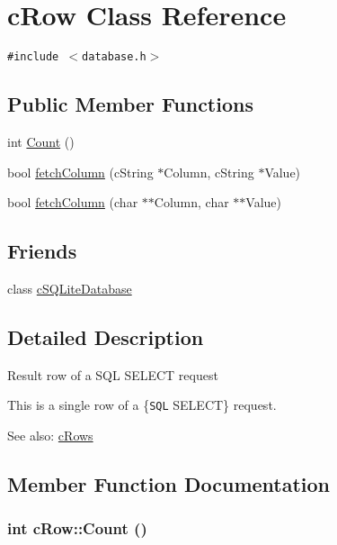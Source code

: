 \hypertarget{classcRow}{
\section{cRow Class Reference}
\label{classcRow}
}
{\tt \#include $<$database.h$>$}

\subsection*{Public Member Functions}
\begin{CompactItemize}
\item 
int \hyperlink{classcRow_88b64cc4fcf8f0974f2cf11e875fbaf4}{Count} ()
\item 
bool \hyperlink{classcRow_4b1e1e5ffe36d35c61476bc2e4ef4eb1}{fetchColumn} (cString $\ast$Column, cString $\ast$Value)
\item 
bool \hyperlink{classcRow_a2dcc3d44451c793483493502ef72eb1}{fetchColumn} (char $\ast$$\ast$Column, char $\ast$$\ast$Value)
\end{CompactItemize}
\subsection*{Friends}
\begin{CompactItemize}
\item 
\hypertarget{classcRow_224b94ad297724d01a0ad06388446137}{
class \hyperlink{classcRow_224b94ad297724d01a0ad06388446137}{cSQLiteDatabase}}
\label{classcRow_224b94ad297724d01a0ad06388446137}

\end{CompactItemize}


\subsection{Detailed Description}
Result row of a SQL SELECT request

This is a single row of a \{{\tt SQL} SELECT\} request.

\begin{Desc}
\item[See also:]\hyperlink{classcRows}{cRows} \end{Desc}


\subsection{Member Function Documentation}
\hypertarget{classcRow_88b64cc4fcf8f0974f2cf11e875fbaf4}{
\subsubsection[{Count}]{\setlength{\rightskip}{0pt plus 5cm}int cRow::Count ()}}
\label{classcRow_88b64cc4fcf8f0974f2cf11e875fbaf4}


